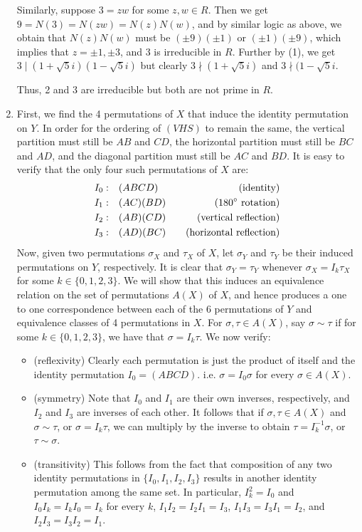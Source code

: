 \begin{enumerate}
    Similarly, suppose $3 = zw$ for some $z, w \in R$. Then we get $9 = N(3) = N(zw) = N(z)N(w)$, and by similar logic as above, we obtain that $N(z)N(w)$ must be $(\pm 9)(\pm 1)$ or $(\pm 1)(\pm 9)$, which implies that $z = \pm 1, \pm 3$, and 3 is irreducible in $R$. Further by (1), we get $3 \mid (1 + \sqrt{5}i)(1 - \sqrt{5}i)$ but clearly $3 \nmid (1 + \sqrt{5}i)$ and $3 \nmid (1 - \sqrt{5}i$.
    
    Thus, 2 and 3 are irreducible but both are not prime in $R$.
    
    
    \item First, we find the 4 permutations of $X$ that induce the identity permutation on $Y$. In order for the ordering of $(VHS)$ to remain the same, the vertical partition must still be $AB$ and $CD$, the horizontal partition must still be $BC$ and $AD$, and the diagonal partition must still be $AC$ and $BD$. It is easy to verify that the only four such permutations of $X$ are:
    \begin{align*}
        I_0: &\quad (ABCD) &\quad \text{(identity)}\\
        I_1: &\quad (AC)(BD) &\quad (180^\circ \text{ rotation)}\\
        I_2: &\quad (AB)(CD) &\quad \text{(vertical reflection)} \\
        I_3: &\quad (AD)(BC) &\quad \text{(horizontal reflection)}
    \end{align*}
    Now, given two permutations $\sigma_X$ and $\tau_X$ of $X$, let $\sigma_Y$ and $\tau_Y$ be their induced permutations on $Y$, respectively. It is clear that $\sigma_Y = \tau_Y$ whenever $\sigma_X = I_k\tau_X$ for some $k \in \{0, 1, 2, 3\}$. We will show that this induces an equivalence relation on the set of permutations $A(X)$ of $X$, and hence produces a one to one correspondence between each of the 6 permutations of $Y$ and equivalence classes of 4 permutations in $X$. For $\sigma, \tau \in A(X)$, say $\sigma \sim \tau$ if for some $k \in \{0, 1, 2, 3\}$, we have that $\sigma = I_k\tau$. We now verify:
    \begin{itemize}
        \item (reflexivity) Clearly each permutation is just the product of itself and the identity permutation $I_0 = (ABCD)$. i.e. $\sigma = I_0\sigma$ for every $\sigma \in A(X)$.
        \item (symmetry) Note that $I_0$ and $I_1$ are their own inverses, respectively, and $I_2$ and $I_3$ are inverses of each other. It follows that if $\sigma, \tau \in A(X)$ and $\sigma \sim \tau$, or $\sigma = I_k\tau$, we can multiply by the inverse to obtain $\tau = I_k^{-1}\sigma$, or $\tau \sim \sigma$.
        \item (transitivity) This follows from the fact that composition of any two identity permutations in $\{I_0, I_1, I_2, I_3\}$ results in another identity permutation among the same set. In particular, $I_k^2 = I_0$ and $I_0I_k = I_kI_0 = I_k$ for every $k$, $I_1I_2 = I_2I_1 = I_3$, $I_1I_3 = I_3I_1 = I_2$, and $I_2I_3 = I_3I_2 = I_1$.
    \end{itemize}
    

\end{enumerate}
